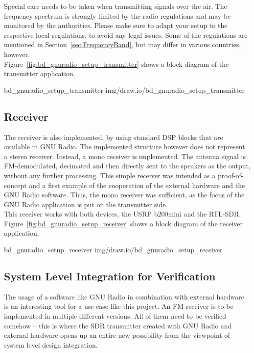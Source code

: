 Special care needs to be taken when transmitting signals over the air.
The frequency spectrum is strongly limited by the radio regulations and may be monitored by the authorities.
Please make sure to adapt your setup to the respective local regulations, to avoid any legal issues.
Some of the regulations are mentioned in Section~\ref{sec:FrequencyBand}, but may differ in various countries, however.\\

\noindent
Figure~\ref{fig:bd_gnuradio_setup_transmitter} shows a block diagram of the transmitter application.

 {bd_gnuradio_setup_transmitter} {img/draw.io/bd_gnuradio_setup_transmitter}


\subsection{Receiver}

The receiver is also implemented, by using standard DSP blocks that are available in GNU Radio.
The implemented structure however does not represent a stereo receiver.
Instead, a mono receiver is implemented.
The antenna signal is FM-demodulated, decimated and then directly sent to the speakers as the output, without any further processing.
This simple receiver was intended as a proof-of-concept and a first example of the cooperation of the external hardware and the GNU Radio software.
Thus, the mono receiver was sufficient, as the focus of the GNU Radio application is put on the transmitter side.\\

This receiver works with both devices, the USRP b200mini and the RTL-SDR.
Figure~\ref{fig:bd_gnuradio_setup_receiver} shows a block diagram of the receiver application.

 {bd_gnuradio_setup_receiver} {img/draw.io/bd_gnuradio_setup_receiver}

\subsection{System Level Integration for Verification}

The usage of a software like GNU Radio in combination with external hardware is an interesting tool for a use-case like this project.
An FM receiver is to be implemented in multiple different versions.
All of them need to be verified somehow -- this is where the SDR transmitter created with GNU Radio and external hardware opens up an entire new possibility from the viewpoint of system level design integration.\\

